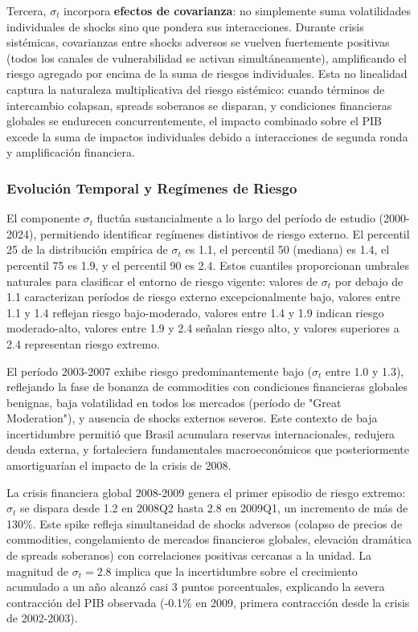 \documentclass[3p,11pt,draft,natbib=false]{elsarticle}
\begin{document}
Tercera, $\sigma_t$ incorpora \textbf{efectos de covarianza}: no simplemente suma volatilidades individuales de shocks sino que pondera sus interacciones. Durante crisis sistémicas, covarianzas entre shocks adversos se vuelven fuertemente positivas (todos los canales de vulnerabilidad se activan simultáneamente), amplificando el riesgo agregado por encima de la suma de riesgos individuales. Esta no linealidad captura la naturaleza multiplicativa del riesgo sistémico: cuando términos de intercambio colapsan, spreads soberanos se disparan, y condiciones financieras globales se endurecen concurrentemente, el impacto combinado sobre el PIB excede la suma de impactos individuales debido a interacciones de segunda ronda y amplificación financiera.

\subsubsection{Evolución Temporal y Regímenes de Riesgo}

El componente $\sigma_t$ fluctúa sustancialmente a lo largo del período de estudio (2000-2024), permitiendo identificar regímenes distintivos de riesgo externo. El percentil 25 de la distribución empírica de $\sigma_t$ es 1.1, el percentil 50 (mediana) es 1.4, el percentil 75 es 1.9, y el percentil 90 es 2.4. Estos cuantiles proporcionan umbrales naturales para clasificar el entorno de riesgo vigente: valores de $\sigma_t$ por debajo de 1.1 caracterizan períodos de riesgo externo excepcionalmente bajo, valores entre 1.1 y 1.4 reflejan riesgo bajo-moderado, valores entre 1.4 y 1.9 indican riesgo moderado-alto, valores entre 1.9 y 2.4 señalan riesgo alto, y valores superiores a 2.4 representan riesgo extremo.

El período 2003-2007 exhibe riesgo predominantemente bajo ($\sigma_t$ entre 1.0 y 1.3), reflejando la fase de bonanza de commodities con condiciones financieras globales benignas, baja volatilidad en todos los mercados (período de "Great Moderation"), y ausencia de shocks externos severos. Este contexto de baja incertidumbre permitió que Brasil acumulara reservas internacionales, redujera deuda externa, y fortaleciera fundamentales macroeconómicos que posteriormente amortiguarían el impacto de la crisis de 2008.

La crisis financiera global 2008-2009 genera el primer episodio de riesgo extremo: $\sigma_t$ se dispara desde 1.2 en 2008Q2 hasta 2.8 en 2009Q1, un incremento de más de 130\%. Este spike refleja simultaneidad de shocks adversos (colapso de precios de commodities, congelamiento de mercados financieros globales, elevación dramática de spreads soberanos) con correlaciones positivas cercanas a la unidad. La magnitud de $\sigma_t = 2.8$ implica que la incertidumbre sobre el crecimiento acumulado a un año alcanzó casi 3 puntos porcentuales, explicando la severa contracción del PIB observada (-0.1\% en 2009, primera contracción desde la crisis de 2002-2003).
\end{document}
